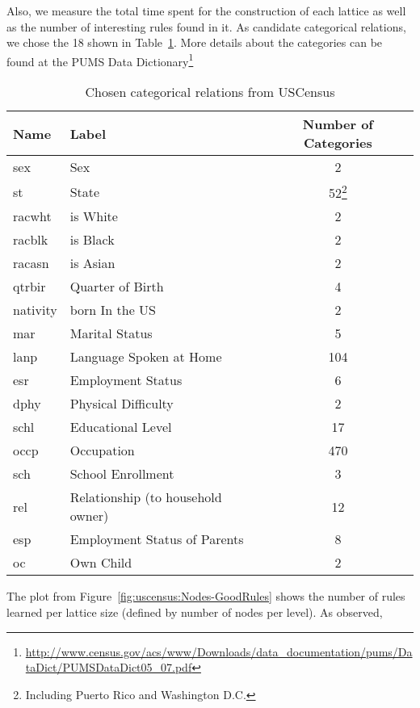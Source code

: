 Also, we measure the total time spent for the construction of each lattice as well as the number of interesting rules
found in it. As candidate categorical relations, we chose the 18 shown in Table~\ref{tab:uscensusRelations}. More
details about the categories can be found at the PUMS
Data
Dictionary\footnote{\url{http://www.census.gov/acs/www/Downloads/data_documentation/pums/DataDict/PUMSDataDict05_07.pdf}
}

\begin{table}[h!]
\begin{minipage}{\textwidth}
 \begin{center}
 \caption{Chosen categorical relations from USCensus}
  \begin{tabular}{l l c}
    \toprule
      Name	& Label				& Number of Categories \\
    \midrule
      sex	& Sex				&	2	\\
      st	& State				&	52\footnote{Including Puerto Rico and Washington D.C.}	\\
      racwht	& is White			&	2	\\
      racblk	& is Black			&	2	\\
      racasn	& is Asian			&	2	\\
      qtrbir	& Quarter of Birth		&	4	\\	
      nativity	& born In the US		&	2	\\
      mar	& Marital Status		&	5	\\
      lanp	& Language Spoken at Home	&	104	\\
      esr	& Employment Status		&	6	\\
      dphy	& Physical Difficulty		&	2	\\
      schl	& Educational Level		&	17	\\	
      occp	& Occupation			&	470	\\
      sch	& School Enrollment		&	3	\\
      rel	& Relationship (to household owner)		&	12	\\
      esp	& Employment Status of Parents	&	8	\\
      oc	& Own Child			&	2	\\
    \bottomrule
  \end{tabular}
 \label{tab:uscensusRelations}
 \end{center}
\end{minipage}
\end{table}

The plot from Figure~\ref{fig:uscensus:Nodes-GoodRules} shows the number of rules learned per lattice size (defined by
number of nodes per level). As observed, 



